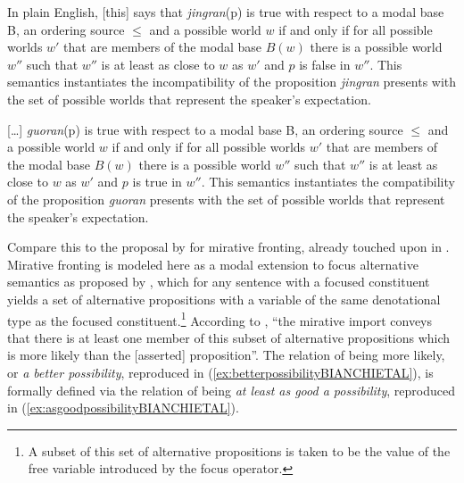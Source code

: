 \begin{displayquote}
	In plain English, [this] says that \textit{jingran}(p) is true with respect to a modal base B, an ordering source $\leq$ and a possible world $w$ if and only if for all possible worlds $w'$ that are members of the modal base $B(w)$ there is a possible world $w''$ such that $w''$ is at least as close to $w$ as $w'$ and $p$ is false in $w''$. This semantics instantiates the incompatibility of the proposition \textit{jingran} presents with the set of possible worlds that represent the speaker's expectation.

	[\ldots] \textit{guoran}(p) is true with respect to a modal base B, an ordering source $\leq$ and a possible world $w$ if and only if for all possible worlds $w'$ that are members of the modal base $B(w)$ there is a possible world $w''$ such that $w''$ is at least as close to $w$ as $w'$ and $p$ is true in $w''$. This semantics instantiates the compatibility of the proposition \textit{guoran} presents with the set of possible worlds that represent the speaker's expectation. \hfill \hbox{\citep[171]{Wu.2008}}
\end{displayquote}


Compare this to the proposal by \citet{BianchiBocciCruschina.2016} for mirative fronting, already touched upon in . Mirative fronting is modeled here as a modal extension to focus alternative semantics as proposed by \citet{Rooth1992}, which for any sentence with a focused constituent yields a set of alternative propositions with a variable of the same denotational type as the focused constituent.\footnote{A subset of this set of alternative propositions is taken to be the value of the free variable introduced by the focus operator.} According to \citet[14]{BianchiBocciCruschina.2016}, ``the mirative import conveys that there is at least one member of this subset of alternative propositions which is more likely than the [asserted] proposition''. The relation of being more likely, or \textit{a better possibility}, reproduced in (\ref{ex:betterpossibilityBIANCHIETAL}), is formally defined via the relation of being \textit{at least as good a possibility}, reproduced in (\ref{ex:asgoodpossibilityBIANCHIETAL}). 

